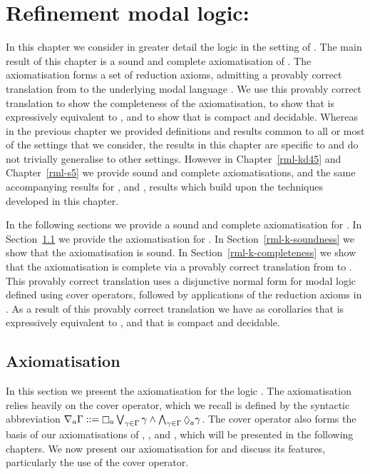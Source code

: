 \chapter{Refinement modal logic: \classK{}}\label{rml-k}

In this chapter we consider in greater detail the logic \logicRmlK{} in the setting of \classK{}.
The main result of this chapter is a sound and complete axiomatisation of \logicRmlK{}.
The axiomatisation forms a set of reduction axioms, admitting a provably correct translation from \langRml{} to the underlying modal language \langMl{}.
We use this provably correct translation to show the completeness of the axiomatisation, to show that \logicRmlK{} is expressively equivalent to \logicK{}, and to show that \logicRmlK{} is compact and decidable.
Whereas in the previous chapter we provided definitions and results common to all or most of the settings that we consider, the results in this chapter are specific to \logicRmlK{} and do not trivially generalise to other settings.
However in Chapter~\ref{rml-kd45} and Chapter~\ref{rml-s5} we provide sound and complete axiomatisations, and the same accompanying results for \logicRmlKFF{}, \logicRmlKD{} and \logicRmlS{}, results which build upon the techniques developed in this chapter.

In the following sections we provide a sound and complete axiomatisation for \logicRmlK{}.
In Section~\ref{rml-k-axiomatisation} we provide the axiomatisation for \logicRmlK{}.
In Section~\ref{rml-k-soundness} we show that the axiomatisation is sound.
In Section~\ref{rml-k-completeness} we show that the axiomatisation is complete via a provably correct translation from \langRml{} to \langMl{}.
This provably correct translation uses a disjunctive normal form for modal logic defined using cover operators, followed by applications of the reduction axioms in \axiomRmlK{}.
As a result of this provably correct translation we have as corollaries that \logicRmlK{} is expressively equivalent to \logicK{}, and that \logicRml{} is compact and decidable.

\section{Axiomatisation}\label{rml-k-axiomatisation}

In this section we present the axiomatisation \axiomRmlK{} for the logic \logicRmlK{}.
The axiomatisation relies heavily on the cover operator, which we recall is defined by the syntactic abbreviation $\coversA \Gamma ::= \necessaryA \bigvee_{\gamma \in \Gamma} \gamma \land \bigwedge_{\gamma \in \Gamma} \possibleA \gamma$.
The cover operator also forms the basis of our axiomatisations of \logicRmlKFF{}, \logicRmlKD{}, and \logicRmlS{}, which will be presented in the following chapters.
We now present our axiomatisation for \logicRmlK{} and discuss its features, particularly the use of the cover operator.

